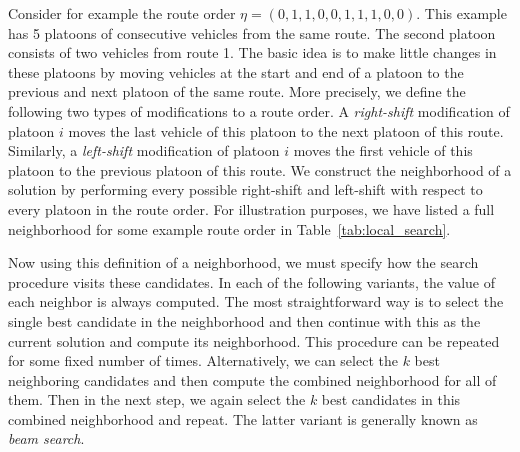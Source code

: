 \documentclass{report}
\theoremstyle{definition}
\theoremstyle{plain}
\begin{document}
Consider for example the route order
$\eta = (0, 1, 1, 0, 0, 1, 1, 1, 0, 0)$. This example has 5 platoons of
consecutive vehicles from the same route. The second platoon consists of two
vehicles from route 1.
The basic idea is to make little changes in these platoons by moving vehicles at
the start and end of a platoon to the previous and next platoon of the same
route.
%
More precisely, we define the following two types of modifications to a route
order. A \textit{right-shift} modification of platoon $i$ moves the last vehicle of this
platoon to the next platoon of this route. Similarly, a \textit{left-shift} modification
of platoon $i$ moves the first vehicle of this platoon to the previous platoon
of this route.
%
We construct the neighborhood of a solution by performing every possible
right-shift and left-shift with respect to every platoon in the route order. For
illustration purposes, we have listed a full neighborhood for some example route
order in Table~\ref{tab:local_search}.

Now using this definition of a neighborhood, we must specify how the search
procedure visits these candidates.
In each of the following variants, the value of each neighbor is always computed.
%
The most straightforward way is to select the single best candidate in the
neighborhood and then continue with this as the current solution and compute its
neighborhood. This procedure can be repeated for some fixed number of times.
Alternatively, we can select the $k$ best neighboring candidates and then
compute the combined neighborhood for all of them. Then in the next step, we
again select the $k$ best candidates in this combined neighborhood and repeat.
The latter variant is generally known as \textit{beam search}.

\newcommand*{\one}{{\color{blue}1}}%
\newcommand*{\zero}{{\color{red}0}}%
\end{document}
